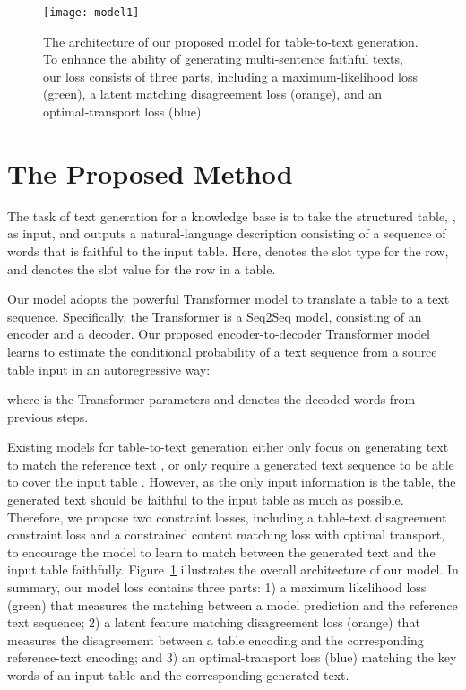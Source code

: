 \documentclass[11pt,a4paper]{article}
\begin{document}
\begin{figure}[!t]
    \centering
    \texttt{[image: model1]}
    \vspace{-0.6cm}
    \caption{The architecture of our proposed model for table-to-text generation. To enhance the ability of generating multi-sentence faithful texts, our loss consists of three parts, including a maximum-likelihood loss (green), a latent matching disagreement loss (orange), and an optimal-transport loss (blue).}
    \label{fig:architecture}
    \vspace{-0.5cm}
\end{figure}


\section{The Proposed Method}

The task of text generation for a knowledge base is to take the structured table, , as
input, and outputs a natural-language description consisting of a sequence of words  that is faithful to the input table. Here,  denotes the slot type for the  row, and  denotes the slot value for the  row in a table.

Our model adopts the powerful Transformer model \cite{Vaswani2017} to translate a table to a text sequence. Specifically, the Transformer is a Seq2Seq model, consisting of an encoder and a decoder. Our proposed encoder-to-decoder Transformer model learns to estimate the conditional probability of a text sequence from a source table input in an autoregressive way:
\vspace{-0.3cm}
\par\vspace{-0.2cm}
\noindent where  is the Transformer parameters and  denotes the decoded words from previous steps. 

Existing models for table-to-text generation either only focus on generating text to match the reference text \cite{structure2018, Ma2019}, or only require a generated text sequence to be able to cover the input table \cite{Wang2018}. However, as the only input information is the table, the generated text should be faithful to the input table as much as possible. Therefore, we propose two constraint losses, including a table-text disagreement constraint loss and a constrained content matching loss with optimal transport, to encourage the model to learn to match between the generated text and the input table faithfully. Figure~\ref{fig:architecture} illustrates the overall architecture of our model. In summary, our model loss contains three parts: 1) a maximum likelihood loss (green) that measures the matching between a model prediction and the reference text sequence; 2) a latent feature matching disagreement loss (orange) that measures the disagreement between a table encoding and the corresponding reference-text encoding; and 3) an optimal-transport loss (blue) matching the key words of an input table and the corresponding generated text.
\end{document}
